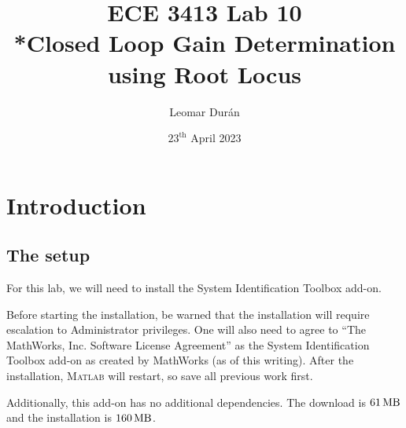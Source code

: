 \documentclass[12pt]{article}
\title{ECE 3413 Lab 10\\*Closed Loop Gain Determination using Root Locus}
\author{Leomar Dur\'an}
\date{${23}^{\text{th}}$ April 2023}
\begin{document}
\maketitle
\newpage

\section{Introduction}\label{sec:intro}

\subsection{The setup}\label{ssc:the setup}

For this lab,
we will need to install the System Identification Toolbox add-on.

Before starting the installation,
be warned that the installation will require escalation to Administrator privileges.
One will also need to agree to ``The MathWorks, Inc. Software License Agreement''
as the System Identification Toolbox add-on as created by MathWorks%
{} (as of this writing).
After the installation, \textsc{Matlab} will restart,
so save all previous work first.

Additionally,
this add-on has no additional dependencies.
The download is $\SI{61}{\mega\byte}$ and the installation is $\SI{160}{\mega\byte}$.
\end{document}

